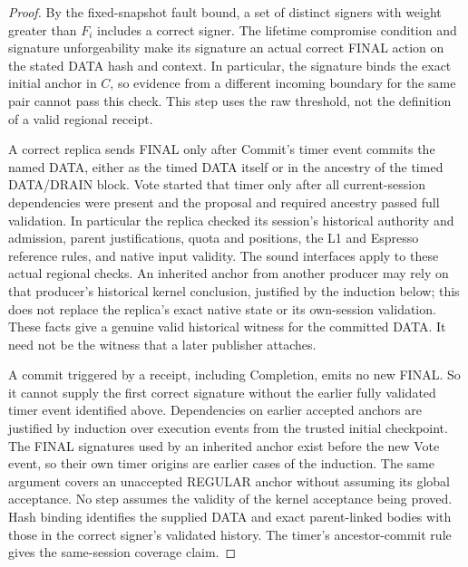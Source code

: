 \documentclass[11pt,a4paper]{article}
\begin{document}
\begin{proof}
By the fixed-snapshot fault bound, a set of distinct signers with weight
greater than $F_i$ includes a correct signer. The lifetime compromise
condition and signature unforgeability make its signature an actual
correct FINAL action on the stated DATA hash and context. In particular,
the signature binds the exact initial anchor in $C$, so evidence from a
different incoming boundary for the same pair cannot pass this check.
This step uses the raw threshold, not the definition of a valid regional
receipt.

A correct replica sends FINAL only after Commit's timer event commits the
named DATA, either as the timed DATA itself or in the ancestry of the
timed DATA/DRAIN block. Vote started that timer only after all
current-session dependencies were present and the proposal and required
ancestry passed full validation. In particular the replica checked its
session's historical authority and admission, parent justifications,
quota and positions, the L1 and Espresso reference rules, and native
input validity. The sound interfaces apply to these actual regional
checks. An inherited anchor from another producer may rely on that
producer's historical kernel conclusion, justified by the induction
below; this does not replace the replica's exact native state or its
own-session validation. These facts give a genuine valid historical
witness for the committed DATA. It need not be the witness that a later
publisher attaches.

A commit triggered by a receipt, including Completion, emits no new
FINAL. So it cannot supply the first correct signature without the
earlier fully validated timer event identified above. Dependencies on
earlier accepted anchors are justified by induction over execution
events from the trusted initial checkpoint. The FINAL signatures used by
an inherited anchor exist before the new Vote event, so their own timer
origins are earlier cases of the induction. The same argument covers an
unaccepted REGULAR anchor without assuming its global acceptance. No step
assumes the validity of the kernel acceptance being proved. Hash binding
identifies the supplied DATA and exact parent-linked bodies with those in
the correct signer's validated history. The timer's ancestor-commit rule
gives the same-session coverage claim.
\end{proof}
\end{document}

